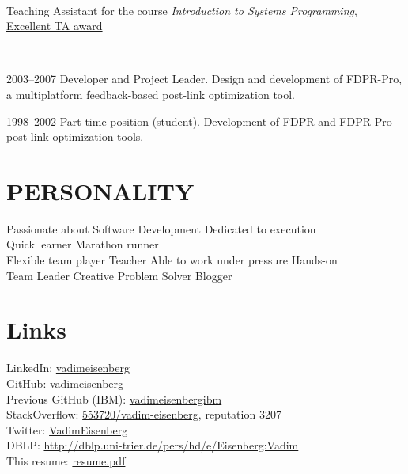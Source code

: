 \documentclass[]{deedy-resume}
\begin{document}
\begin{minipage}[t]{0.66\textwidth}
 \\
\vspace{\topsep} %
Teaching Assistant for the course \textit{Introduction to Systems Programming}, \href{https://ugportal.net.technion.ac.il/files/2014/05/horev-tashasa.pdf}{Excellent TA award}
\sectionsep

 \\
\vspace{\topsep} %
\begin{tightemize}
\item 2003--2007 Developer and Project Leader. Design and development of FDPR-Pro, a multiplatform feedback-based post-link optimization tool.
\item  1998--2002 Part time position (student). Development of FDPR and FDPR-Pro post-link optimization tools.
\end{tightemize}
\sectionsep


\section{PERSONALITY}
Passionate about Software Development \textbullet{} Dedicated to execution\\
Quick learner \textbullet{} Marathon runner\\
Flexible team player \textbullet{} Teacher \textbullet{}  Able to work under pressure \textbullet{} Hands-on\\
Team Leader \textbullet{} Creative Problem Solver \textbullet{} Blogger

\section{Links}
LinkedIn:  \href{https://www.linkedin.com/in/vadimeisenberg}{vadimeisenberg} \\
GitHub: \href{https://github.com/vadimeisenberg}{vadimeisenberg} \\
Previous GitHub (IBM): \href{https://github.com/vadimeisenbergibm}{vadimeisenbergibm} \\
StackOverflow: \href{http://stackoverflow.com/users/553720/vadim-eisenberg}{553720/vadim-eisenberg}, reputation 3207 \\
Twitter: \href{https://twitter.com/VadimEisenberg}{VadimEisenberg} \\
DBLP: \href{http://dblp.uni-trier.de/pers/hd/e/Eisenberg:Vadim}{http://dblp.uni-trier.de/pers/hd/e/Eisenberg:Vadim} \\
This resume: \href{https://github.com/VadimEisenberg/resume/raw/gh-pages/resume.pdf}{resume.pdf}


\end{minipage}
\end{document}
